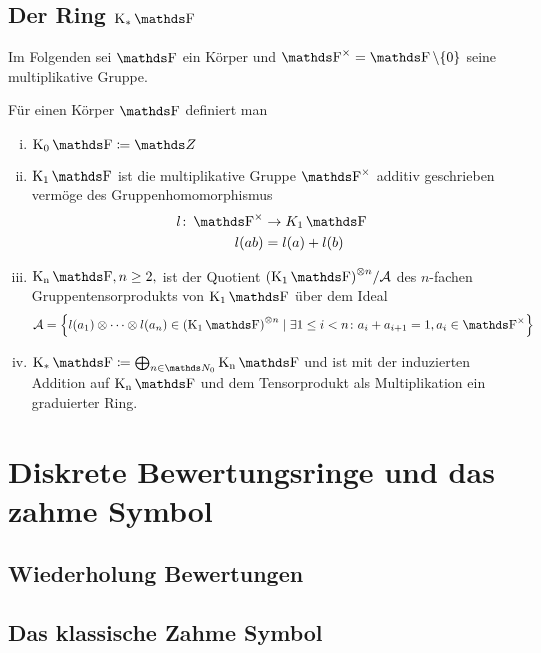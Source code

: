 \documentclass[ngerman,fontsize=11pt, paper=a4, parskip=half, titlepage=true, toc=bib]{scrartcl}
\begin{document}
\subsection{Der Ring $\KF$}
Im Folgenden sei $\F$ ein Körper und $\Fx=\F\setminus \{0\}$ seine
multiplikative Gruppe.

\begin{Def}[$\KF$]
  Für einen Körper $\F$ definiert man
  \begin{enumerate}[i)]
  \item $\K_0\F\coloneqq \Z$
  \item $\K_1\F$ ist die multiplikative Gruppe $\Fx$ additiv geschrieben
    vermöge des Gruppenhomomorphismus 
    \begin{align*}
      l\colon \Fx&\to K_1\F\\
      l(ab)&=l(a)+l(b)
    \end{align*}
  \item $\KnF, n\geq 2,$ ist der Quotient 
    ${(\K_1\F)}^{\otimes n}/\A$
    des $n$-fachen Gruppentensorprodukts von $\K_1\F$ über dem Ideal 
    \begin{gather*}
      \A=\left\{ l(a_1)\otimes\dotsb\otimes l(a_n)
        \in {(\K_1\F)}^{\otimes n}
        \mid
        \exists 1\leq i < n \colon a_i+a_{i+1}=1, a_i\in\Fx \right\}
    \end{gather*}
  \item $\KF\coloneqq \bigoplus_{n\in\N_0}\KnF$ und ist mit der
    induzierten Addition auf $\KnF$ und dem Tensorprodukt als
    Multiplikation ein graduierter Ring.
  \end{enumerate}
\end{Def}


\section{Diskrete Bewertungsringe und das zahme Symbol}
\cite[][Lemma 2.1]{milnor}

\subsection{Wiederholung Bewertungen}
\begin{Def}[Bewertungsabbildung]\end{Def}
\begin{Def}\end{Def}

\subsection{Das klassische Zahme Symbol}
\begin{Def}\end{Def}
\end{document}
